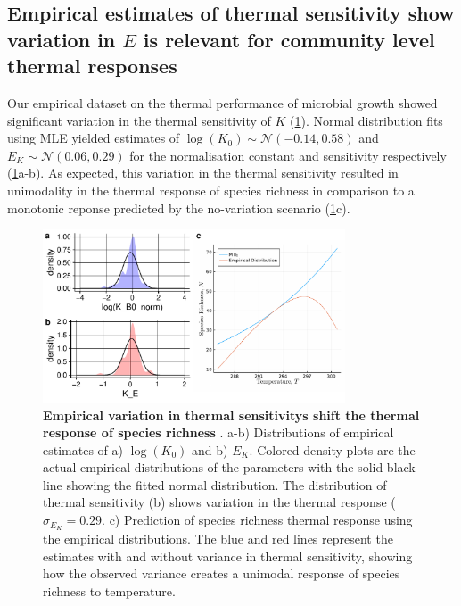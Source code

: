 \documentclass{article}
\begin{document}

\subsection*{Empirical estimates of thermal sensitivity show variation in $E$ is relevant for community level thermal responses}

Our empirical dataset on the thermal performance of microbial growth showed significant variation in the thermal sensitivity of $K$ (\cref{Fig:TPC_data}). Normal distribution fits using MLE yielded estimates of $\log(K_0) \sim \mathcal{N}(-0.14,0.58)$ and $E_K \sim \mathcal{N}(0.06,0.29)$ for the normalisation constant and sensitivity respectively (\cref{Fig:TPC_data}a-b). As expected, this variation in the thermal sensitivity resulted in unimodality in the thermal response of species richness in comparison to a monotonic reponse predicted by the no-variation scenario (\cref{Fig:TPC_data}c). 

\begin{figure}
    \centering
    \includegraphics[width = 0.8\textwidth]{docs/Figures/MTE_fig.pdf}
    \caption{\textbf{Empirical variation in thermal sensitivitys shift the thermal response of species richness }. a-b) Distributions of empirical estimates of a) $\log(K_0)$ and b) $E_K$. Colored density plots are the actual empirical distributions of the parameters with the solid black line showing the fitted normal distribution. The distribution of thermal sensitivity (b) shows variation in the thermal response ($\sigma_{E_K} = 0.29$. c) Prediction of species richness thermal response using the empirical distributions. The blue and red lines represent the estimates with and without variance in thermal sensitivity, showing how the observed variance creates a unimodal response of species richness to temperature.}
    \label{Fig:TPC_data}
\end{figure}
\end{document}
